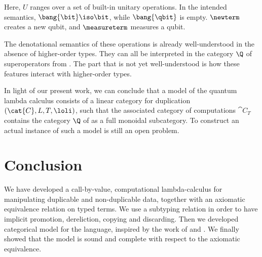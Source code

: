 \documentclass{llncs}
\begin{document}
Here, $U$ ranges over a set of built-in unitary operations. In the
intended semantics, $\bang{\bit}\iso\bit$, while $\bang{\qbit}$ is
empty. $\newterm$ creates a new qubit, and $\measureterm$ measures a
qubit. 

The denotational semantics of these operations is already
well-understood in the absence of higher-order types. They can all be
interpreted in the category $\Q$ of superoperators from
{\cite{selinger04quantum}}.  The part that is not yet well-understood
is how these features interact with higher-order types. 

In light of our present work, we can conclude that a model of the
quantum lambda calculus consists of a linear category for duplication
$(\cat{C},L,T,\loli)$, such that the associated category of
computations $\cat{C}_T$ contains the category $\Q$ of
{\cite{selinger04quantum}} as a full monoidal subcategory.  To
construct an actual instance of such a model is still an open problem.

\section{Conclusion}

We have developed a call-by-value, computational lambda-calculus for
manipulating duplicable and non-duplicable data, together with an
axiomatic equivalence relation on typed terms. We use a subtyping
relation in order to have implicit promotion, dereliction, copying and
discarding. 
Then we developed categorical model for the language, inspired by
the work of \cite{bierman93intuitionistic} and \cite{moggi91notions}.
We finally showed that the model is sound and complete with respect to
the axiomatic equivalence.
\end{document}

